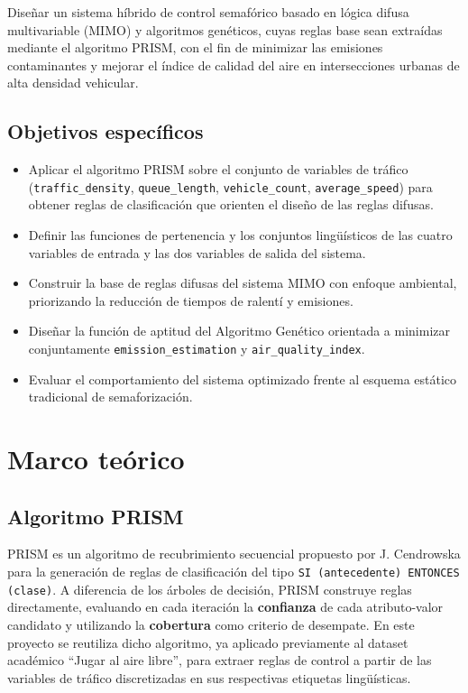\documentclass[12pt,a4paper]{article}
\begin{document}
Diseñar un sistema híbrido de control semafórico basado en lógica difusa
multivariable (MIMO) y algoritmos genéticos, cuyas reglas base sean
extraídas mediante el algoritmo PRISM, con el fin de minimizar las
emisiones contaminantes y mejorar el índice de calidad del aire en
intersecciones urbanas de alta densidad vehicular.

\subsection{Objetivos específicos}

\begin{itemize}
 \item Aplicar el algoritmo PRISM sobre el conjunto de variables de
 tráfico (\texttt{traffic\_density}, \texttt{queue\_length},
 \texttt{vehicle\_count}, \texttt{average\_speed}) para obtener reglas
 de clasificación que orienten el diseño de las reglas difusas.
 \item Definir las funciones de pertenencia y los conjuntos
 lingüísticos de las cuatro variables de entrada y las dos variables
 de salida del sistema.
 \item Construir la base de reglas difusas del sistema MIMO con
 enfoque ambiental, priorizando la reducción de tiempos de ralentí y
 emisiones.
 \item Diseñar la función de aptitud del Algoritmo Genético orientada
 a minimizar conjuntamente \texttt{emission\_estimation} y
 \texttt{air\_quality\_index}.
 \item Evaluar el comportamiento del sistema optimizado frente al
 esquema estático tradicional de semaforización.
\end{itemize}


\section{Marco teórico}

\subsection{Algoritmo PRISM}

PRISM es un algoritmo de recubrimiento secuencial propuesto por J.
Cendrowska \cite{cendrowska1987} para la generación de reglas de
clasificación del tipo \texttt{SI (antecedente) ENTONCES (clase)}. A
diferencia de los árboles de decisión, PRISM construye reglas
directamente, evaluando en cada iteración la \textbf{confianza} de cada
atributo-valor candidato y utilizando la \textbf{cobertura} como criterio
de desempate. En este proyecto se reutiliza dicho algoritmo, ya aplicado
previamente al dataset académico ``Jugar al aire libre'', para extraer
reglas de control a partir de las variables de tráfico discretizadas en
sus respectivas etiquetas lingüísticas.
\end{document}
